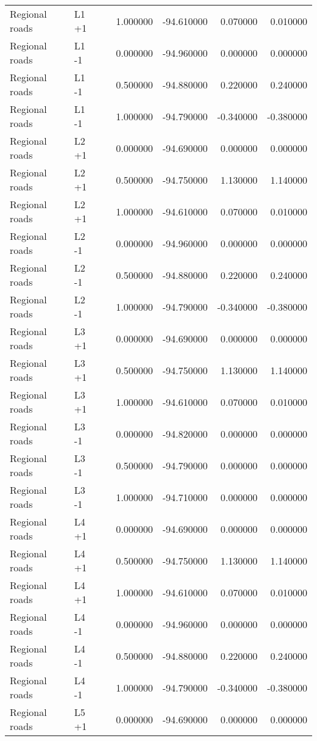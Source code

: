 \begin{tabular}{lllrrrr}
Regional roads & L1 +1 &  & 1.000000 & -94.610000 & 0.070000 & 0.010000 \\
Regional roads & L1 -1 &  & 0.000000 & -94.960000 & 0.000000 & 0.000000 \\
Regional roads & L1 -1 &  & 0.500000 & -94.880000 & 0.220000 & 0.240000 \\
Regional roads & L1 -1 &  & 1.000000 & -94.790000 & -0.340000 & -0.380000 \\
Regional roads & L2 +1 &  & 0.000000 & -94.690000 & 0.000000 & 0.000000 \\
Regional roads & L2 +1 &  & 0.500000 & -94.750000 & 1.130000 & 1.140000 \\
Regional roads & L2 +1 &  & 1.000000 & -94.610000 & 0.070000 & 0.010000 \\
Regional roads & L2 -1 &  & 0.000000 & -94.960000 & 0.000000 & 0.000000 \\
Regional roads & L2 -1 &  & 0.500000 & -94.880000 & 0.220000 & 0.240000 \\
Regional roads & L2 -1 &  & 1.000000 & -94.790000 & -0.340000 & -0.380000 \\
Regional roads & L3 +1 &  & 0.000000 & -94.690000 & 0.000000 & 0.000000 \\
Regional roads & L3 +1 &  & 0.500000 & -94.750000 & 1.130000 & 1.140000 \\
Regional roads & L3 +1 &  & 1.000000 & -94.610000 & 0.070000 & 0.010000 \\
Regional roads & L3 -1 &  & 0.000000 & -94.820000 & 0.000000 & 0.000000 \\
Regional roads & L3 -1 &  & 0.500000 & -94.790000 & 0.000000 & 0.000000 \\
Regional roads & L3 -1 &  & 1.000000 & -94.710000 & 0.000000 & 0.000000 \\
Regional roads & L4 +1 &  & 0.000000 & -94.690000 & 0.000000 & 0.000000 \\
Regional roads & L4 +1 &  & 0.500000 & -94.750000 & 1.130000 & 1.140000 \\
Regional roads & L4 +1 &  & 1.000000 & -94.610000 & 0.070000 & 0.010000 \\
Regional roads & L4 -1 &  & 0.000000 & -94.960000 & 0.000000 & 0.000000 \\
Regional roads & L4 -1 &  & 0.500000 & -94.880000 & 0.220000 & 0.240000 \\
Regional roads & L4 -1 &  & 1.000000 & -94.790000 & -0.340000 & -0.380000 \\
Regional roads & L5 +1 &  & 0.000000 & -94.690000 & 0.000000 & 0.000000 \\

\end{tabular}
